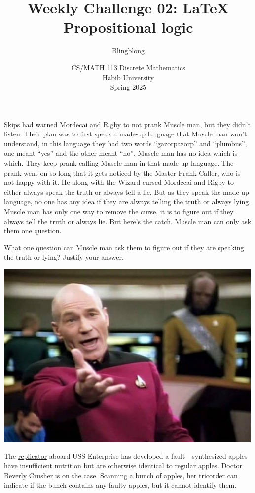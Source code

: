 \documentclass[a4paper]{exam}
\title{Weekly Challenge 02: \LaTeX\; Propositional logic}
\author{Blingblong} %
\date{CS/MATH 113 Discrete Mathematics\\Habib University\\Spring 2025}
\begin{document}
\maketitle

\begin{questions}
  
Skips had warned Mordecai and Rigby to not prank Muscle man, but they didn't listen.
Their plan was to first speak a made-up language that Muscle man won't understand, in this language they had two words ``gazorpazorp'' and ``plumbus'', one meant ``yes'' and the other meant ``no'', Muscle man has no idea which is which. They keep prank calling Muscle man in that made-up language.
The prank went on so long that it gets noticed by the Master Prank Caller, who is not happy with it. He along with the Wizard cursed Mordecai and Rigby to either always speak the truth or always tell a lie. But as they speak the made-up language, no one has any idea if they are always telling the truth or always lying. Muscle man has only one way to remove the curse, it is to figure out if they always tell the truth or always lie. But here's the catch, Muscle man can only ask them one question. 

What one question can Muscle man ask them to figure out if they are speaking the truth or lying? Justify your answer.
\begin{solution}
\end{solution}

  \begin{minipage}{.3\linewidth}
  \centerline{\includegraphics[width=\textwidth]{picard}}
\end{minipage}
\begin{minipage}{.65\linewidth}
  The \href{https://en.wikipedia.org/wiki/Replicator_(Star_Trek)}{replicator} aboard USS Enterprise has developed a fault---synthesized apples have insufficient nutrition but are otherwise identical to regular apples. Doctor \href{https://memory-alpha.fandom.com/wiki/Beverly_Crusher}{Beverly Crusher} is on the case. Scanning a bunch of apples, her \href{https://en.wikipedia.org/wiki/Medical_tricorder}{tricorder} can indicate if the bunch contains any faulty apples, but it cannot identify them.
\end{minipage}


\end{questions}
\end{document}
